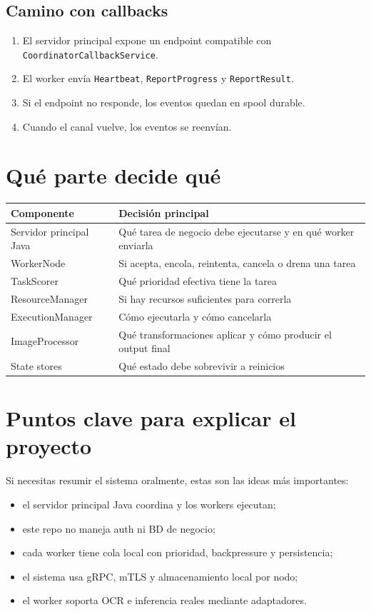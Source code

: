 \documentclass[11pt]{article}
\begin{document}
\subsection{Camino con callbacks}
\begin{enumerate}
\item El servidor principal expone un endpoint compatible con \texttt{CoordinatorCallbackService}.
\item El worker envía \texttt{Heartbeat}, \texttt{ReportProgress} y \texttt{ReportResult}.
\item Si el endpoint no responde, los eventos quedan en spool durable.
\item Cuando el canal vuelve, los eventos se reenvían.
\end{enumerate}

\section{Qué parte decide qué}
\begin{longtable}{>{\raggedright\arraybackslash}p{3.8cm} >{\raggedright\arraybackslash}p{9.6cm}}
\toprule
\textbf{Componente} & \textbf{Decisión principal} \\
\midrule
Servidor principal Java & Qué tarea de negocio debe ejecutarse y en qué worker enviarla \\
WorkerNode & Si acepta, encola, reintenta, cancela o drena una tarea \\
TaskScorer & Qué prioridad efectiva tiene la tarea \\
ResourceManager & Si hay recursos suficientes para correrla \\
ExecutionManager & Cómo ejecutarla y cómo cancelarla \\
ImageProcessor & Qué transformaciones aplicar y cómo producir el output final \\
State stores & Qué estado debe sobrevivir a reinicios \\
\bottomrule
\end{longtable}

\section{Puntos clave para explicar el proyecto}
Si necesitas resumir el sistema oralmente, estas son las ideas más importantes:
\begin{itemize}
\item el servidor principal Java coordina y los workers ejecutan;
\item este repo no maneja auth ni BD de negocio;
\item cada worker tiene cola local con prioridad, backpressure y persistencia;
\item el sistema usa gRPC, mTLS y almacenamiento local por nodo;
\item el worker soporta OCR e inferencia reales mediante adaptadores.
\end{itemize}
\end{document}
